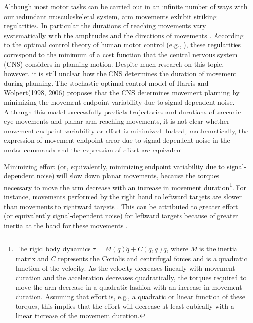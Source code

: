 Although most motor tasks can be carried out in an infinite number of ways with our redundant musculoskeletal system, arm movements exhibit striking regularities. In particular the durations of reaching movements vary systematically with the amplitudes and the directions of movements \cite{Gordon1994}. According to the optimal control theory of human motor control (e.g., \cite{Flash1985, Hoff1994, Uno1989}), these regularities correspond to the minimum of a cost function that the central nervous system (CNS) considers in planning motion. Despite much research on this topic, however, it is still unclear how the CNS determines the duration of movement during planning. The stochastic optimal control model of \cite{Harris1998, Harris2006} Harris and Wolpert(1998, 2006) proposes that the CNS determines movement planning by minimizing the movement endpoint variability due to signal-dependent noise. Although this model successfully predicts trajectories and durations of saccadic eye movements and planar arm reaching movements, it is not clear whether movement endpoint variability or effort is minimized. Indeed, mathematically, the expression of movement endpoint error due to signal-dependent noise in the motor commands and the expression of effort are equivalent \cite{OSullivan2009}.

Minimizing effort (or, equivalently, minimizing endpoint variability due to signal-dependent noise) will slow down planar movements, because the torques necessary to move the arm decrease with an increase in movement duration\footnote{The rigid body dynamics $\tau = M(q)\ddot{q} + C(q,\dot{q})\dot{q}$, where $M$ is the inertia matrix and $C$ represents the Coriolis and centrifugal forces and is a quadratic function of the velocity. As the velocity decreases linearly with movement duration and the acceleration decreases quadratically, the torques required to move the arm decrease in a quadratic fashion with an increase in movement duration. Assuming that effort is, e.g., a quadratic or linear function of these torques, this implies that the effort will decrease at least cubically \cite{Shadmher2016} with a linear increase of the movement duration.}. 
For instance, movements performed by the right hand to leftward targets are slower than movements to rightward targets \cite{Gordon1994,Park2016}. This can be attributed to greater effort (or equivalently signal-dependent noise) for leftward targets because of greater inertia at the hand for these movements \cite{Cos2011, Guigon2007, Schweighofer2015}. 

